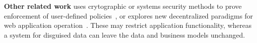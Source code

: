 \textbf{Other related work} uses crytographic or systems security methods to
prove enforcement of user-defined policies~\cite{zeph, riverbed}, or explores
new decentralized paradigms for web application operation~\cite{solid, bstore,
databox, diy, amber, oort, w5, blockstack}.  These may restrict application
functionality, whereas a system for disguised data can leave the data and business models unchanged.
%
%
%
%
%
